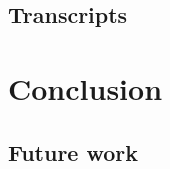\subsection{Transcripts}





\section{Conclusion}\label{sec:paper-conclusion}

\subsection{Future work}
